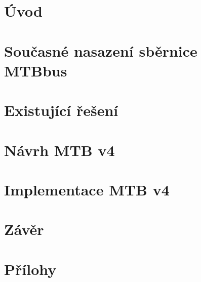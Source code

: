 \documentclass[digital, oneside, table, nolot, nolof]{fithesis3}
\begin{document}

\setlength{\parindent}{0cm}
\setlength{\parskip}{3mm plus2pt minus2pt}
\renewenvironment{compactenum}
	{\begin{enumerate}[leftmargin=8mm,itemsep=0pt,parsep=1pt,topsep=1pt,partopsep=1pt]}
	{\end{enumerate}}
\renewenvironment{compactitem}
	{\begin{itemize}[leftmargin=8mm,itemsep=0pt,parsep=0pt,topsep=1pt,partopsep=1pt]}
	{\end{itemize}}



\chapter{Úvod} \label{chap:uvod}


\chapter{Současné nasazení sběrnice MTBbus} \label{chap:nasazeni}


\chapter{Existující řešení} \label{chap:existujici-reseni}


\chapter{Návrh MTB v4} \label{chap:mtb-v4-design}
%

\chapter{Implementace MTB v4} \label{chap:mtb-v4-impl}
%
%
%
%
%
%

\chapter{Závěr} \label{chap:zaver}
%

\printbibliography[heading=bibintoc]

\appendix
\chapter{Přílohy} \label{chap:appendix}

\end{document}
